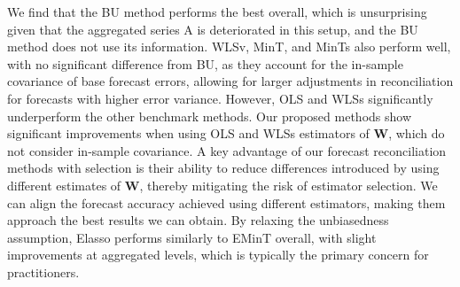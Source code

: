 \documentclass[
  11pt]{article}
\theoremstyle{plain}
\theoremstyle{remark}
\begin{document}
We find that the BU method performs the best overall, which is
unsurprising given that the aggregated series A is deteriorated in this
setup, and the BU method does not use its information. WLSv, MinT, and
MinTs also perform well, with no significant difference from BU, as they
account for the in-sample covariance of base forecast errors, allowing
for larger adjustments in reconciliation for forecasts with higher error
variance. However, OLS and WLSs significantly underperform the other
benchmark methods. Our proposed methods show significant improvements
when using OLS and WLSs estimators of \(\bm{W}\), which do not consider
in-sample covariance. A key advantage of our forecast reconciliation
methods with selection is their ability to reduce differences introduced
by using different estimates of \(\bm{W}\), thereby mitigating the risk
of estimator selection. We can align the forecast accuracy achieved
using different estimators, making them approach the best results we can
obtain. By relaxing the unbiasedness assumption, Elasso performs
similarly to EMinT overall, with slight improvements at aggregated
levels, which is typically the primary concern for practitioners.
\end{document}
